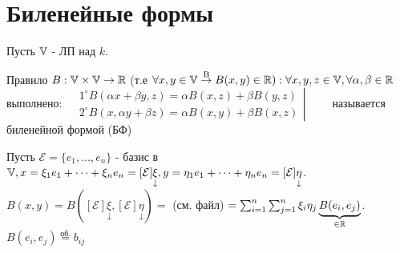 \documentclass[../main.tex]{subfiles}
\begin{document}
\section{Биленейные формы}
Пусть $\mathbb{V}$ - ЛП над $k$.
\begin{definition}
    Правило $B: \mathbb{V} \times \mathbb{V} \to \mathbb{R}$ (т.е $\forall x,y \in \mathbb{V} \overset{\text{B}}{\to} B(x,y)\in\mathbb{R}): \forall x,y,z \in \mathbb{V} , \forall \alpha,\beta \in \mathbb{R}$ выполнено: 
    $\left.\begin{aligned}
        &1^{\circ} B(\alpha x+ \beta y,z) = \alpha B(x,z) + \beta B(y,z) \\
        &2^{\circ} B(x,\alpha y + \beta z) = \alpha B(x,y) + \beta B(x,z) 
    \end{aligned}\right| \qquad$ называется биленейной формой (БФ)
\end{definition}

Пусть $\mathcal{E} = \{ e_{1},\dots,e_{n}\}$ - базис в $\mathbb{V}, x = \xi_{1} e_{1} + \dots + \xi_{n} e_{n} = [\mathcal{E}]\underset{\downarrow}{\xi}, y = \eta_{1} e_{1} + \dots + \eta_{n} e_{n} = [\mathcal{E}]\underset{\downarrow}{\eta}$. 
\\$B(x,y) = B([\mathcal{E}]\underset{\downarrow}{\xi},[\mathcal{E}]\underset{\downarrow}{\eta}) =$ (см. файл) $ = \sum_{i   =1}^{n}\sum_{j=1}^{n} \xi_{i} \eta_{j} \underbrace{B(e_{i},e_{j})}_{\in \mathbb{R}}$. $B(e_{i},e_{j}) \overset{\text{об.}}{=} b_{ij} $  
\end{document}
